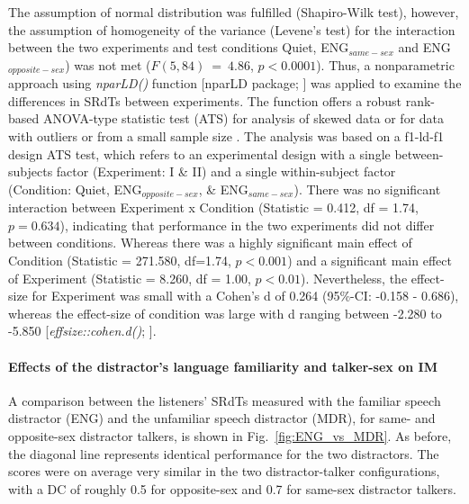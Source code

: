 \documentclass[a4paper, twoside]{templates/ociamthesis}
\begin{document}
The assumption of normal distribution was fulfilled (Shapiro-Wilk test), however, the assumption of homogeneity of the variance (Levene's test) for the interaction between the two experiments and test conditions Quiet, ENG\(_{same-sex}\) and ENG\(_{ opposite-sex}\)) was not met (\(F(5,84)~=~4.86\), \(p < 0.0001\)). Thus, a nonparametric approach using \textit{nparLD()} function {[}nparLD package; \textcite{nparLDPackageR}{]} was applied to examine the differences in SRdTs between experiments. The function offers a robust rank-based ANOVA-type statistic test (ATS) for analysis of skewed data or for data with outliers or from a small sample size \autocite[see][for a good introduction on robust nonparametric techniques]{Feys2016}. The analysis was based on a f1-ld-f1 design ATS test, which refers to an experimental design with a single between-subjects factor (Experiment: I \& II) and a single within-subject factor (Condition: Quiet, ENG\(_{opposite-sex}\), \& ENG\(_{same-sex}\)). There was no significant interaction between Experiment x Condition (Statistic = 0.412, df = 1.74, \(p = 0.634\)), indicating that performance in the two experiments did not differ between conditions. Whereas there was a highly significant main effect of Condition (Statistic = 271.580, df=1.74, \(p < 0.001\)) and a significant main effect of Experiment (Statistic = 8.260, df = 1.00, \(p < 0.01\)). Nevertheless, the effect-size for Experiment was small with a Cohen's d of 0.264 (95\%-CI: -0.158 - 0.686), whereas the effect-size of condition was large with d ranging between -2.280 to -5.850 {[}\textit{effsize::cohen.d()}; \textcite{effsizeRPackage}{]}.\\

\hypertarget{effects-of-the-distractors-language-familiarity-and-talker-sex-on-im}{%
\paragraph{Effects of the distractor's language familiarity and talker-sex on IM}\label{effects-of-the-distractors-language-familiarity-and-talker-sex-on-im}}

\hfill\break
A comparison between the listeners' SRdTs measured with the familiar speech distractor (ENG) and the unfamiliar speech distractor (MDR), for same- and opposite-sex distractor talkers, is shown in Fig.~\ref{fig:ENG_vs_MDR}. As before, the diagonal line represents identical performance for the two distractors. The scores were on average very similar in the two distractor-talker configurations, with a DC of roughly 0.5 for opposite-sex and 0.7 for same-sex distractor talkers.\\
\end{document}
